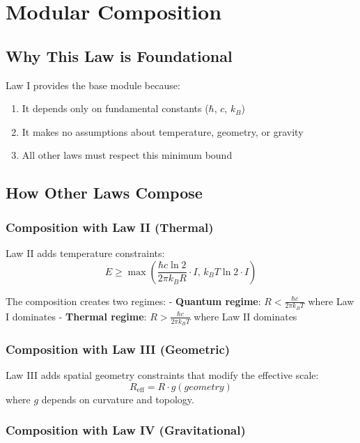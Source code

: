 \documentclass[11pt,a4paper]{article}
\theoremstyle{definition}
\begin{document}
\section{Modular Composition}

\subsection{Why This Law is Foundational}

Law I provides the base module because:
\begin{enumerate}
\item It depends only on fundamental constants ($\hbar$, $c$, $k_B$)
\item It makes no assumptions about temperature, geometry, or gravity
\item All other laws must respect this minimum bound
\end{enumerate}

\subsection{How Other Laws Compose}

\subsubsection{Composition with Law II (Thermal)}

Law II adds temperature constraints:
\begin{equation}
E \geq \max\left(\frac{\hbar c \ln 2}{2\pi k_B R} \cdot I, \, k_B T \ln 2 \cdot I\right)
\end{equation}

The composition creates two regimes:
- \textbf{Quantum regime}: $R < \frac{\hbar c}{2\pi k_B T}$ where Law I dominates
- \textbf{Thermal regime}: $R > \frac{\hbar c}{2\pi k_B T}$ where Law II dominates

\subsubsection{Composition with Law III (Geometric)}

Law III adds spatial geometry constraints that modify the effective scale:
\begin{equation}
R_{\text{eff}} = R \cdot g(geometry)
\end{equation}
where $g$ depends on curvature and topology.

\subsubsection{Composition with Law IV (Gravitational)}
\end{document}
